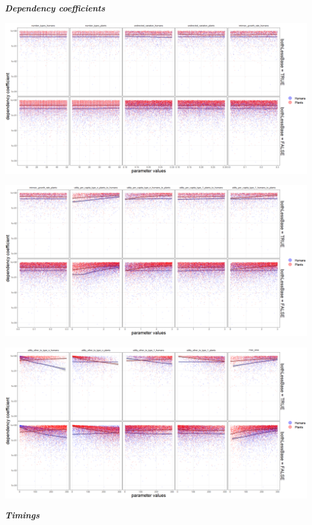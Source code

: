 \documentclass[
]{book}
\begin{document}
\textbf{\emph{Dependency coefficients}}

\includegraphics[width=1\linewidth]{plots/5_LHS_dependency_coefficients_bifurcationPlot_twoVariables_per_parameter_and_scenario_part1}

\includegraphics[width=1\linewidth]{plots/5_LHS_dependency_coefficients_bifurcationPlot_twoVariables_per_parameter_and_scenario_part2}

\includegraphics[width=1\linewidth]{plots/5_LHS_dependency_coefficients_bifurcationPlot_twoVariables_per_parameter_and_scenario_part3}

\textbf{\emph{Timings}}
\end{document}

